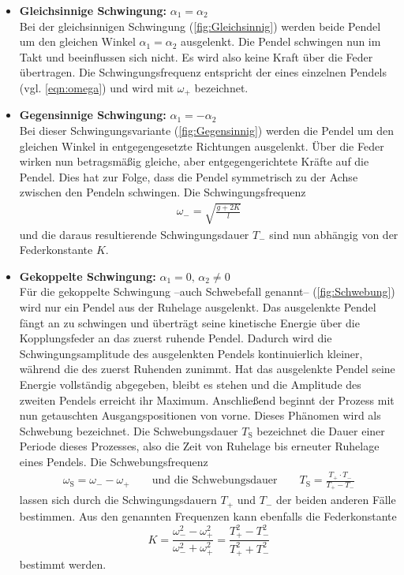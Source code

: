 \begin{itemize}
    \item \textbf{Gleichsinnige Schwingung:} $\alpha_1 = \alpha_2$ \\
    Bei der gleichsinnigen Schwingung (\autoref{fig:Gleichsinnig}) werden beide Pendel um den gleichen Winkel $\alpha_1 = \alpha_2$ ausgelenkt. Die Pendel schwingen nun im Takt und beeinflussen sich nicht.
    Es wird also keine Kraft über die Feder übertragen. Die Schwingungsfrequenz entspricht der eines einzelnen Pendels (vgl. \autoref{eqn:omega}) und wird mit $\omega_+$ bezeichnet.

    \item \textbf{Gegensinnige Schwingung:} $\alpha_1 = -\alpha_2$ \\
    Bei dieser Schwingungsvariante (\autoref{fig:Gegensinnig}) werden die Pendel um den gleichen Winkel in entgegengesetzte Richtungen ausgelenkt. Über die Feder wirken nun betragsmäßig gleiche,
    aber entgegengerichtete Kräfte auf die Pendel. Dies hat zur Folge, dass die Pendel symmetrisch zu der Achse zwischen den Pendeln schwingen. Die Schwingungsfrequenz 
    \begin{gather}
        \label{eqn:omega_Gegensinnig}
        \omega_- = \sqrt{\frac{g + 2K}{l}}
    \end{gather}
    und die daraus resultierende Schwingungsdauer $T_-$ sind nun abhängig von der Federkonstante $K$. 
    
    \item \textbf{Gekoppelte Schwingung:} $\alpha_1 = 0, \, \alpha_2 \neq 0$ \\
    Für die gekoppelte Schwingung --auch Schwebefall genannt-- (\autoref{fig:Schwebung}) wird nur ein Pendel aus der Ruhelage ausgelenkt. Das ausgelenkte Pendel fängt an zu schwingen und überträgt seine 
    kinetische Energie über die Kopplungsfeder an das zuerst ruhende Pendel. Dadurch wird die Schwingungsamplitude des ausgelenkten Pendels kontinuierlich kleiner, während
    die des zuerst Ruhenden zunimmt. Hat das ausgelenkte Pendel seine Energie vollständig abgegeben, bleibt es stehen und die Amplitude des zweiten Pendels erreicht ihr Maximum.
    Anschließend beginnt der Prozess mit nun getauschten Ausgangspositionen von vorne. Dieses Phänomen wird als Schwebung bezeichnet. Die Schwebungsdauer $T_{\text{S}}$ bezeichnet 
    die Dauer einer Periode dieses Prozesses, also die Zeit von Ruhelage bis erneuter Ruhelage eines Pendels. Die Schwebungsfrequenz
    \begin{gather}
        \label{eqn:Schwebung}
        \omega_{\text{S}} = \omega_- - \omega_+ \qquad \text{und die Schwebungsdauer} \qquad T_{\text{S}}  = \frac{T_+ \cdot T_-}{T_+ - T_-}
    \end{gather}
    lassen sich durch die Schwingungsdauern $T_+$ und $T_-$ der beiden anderen Fälle bestimmen.
    Aus den genannten Frequenzen kann ebenfalls die Federkonstante
    \begin{equation}
        \label{eqn:Federkonstante}
        K = \frac{\omega_-^2 - \omega_+^2}{\omega_-^2 + \omega_+^2} = \frac{T_+^2 - T_-^2}{T_+^2 + T_-^2}
    \end{equation}
    bestimmt werden.
\end{itemize}

